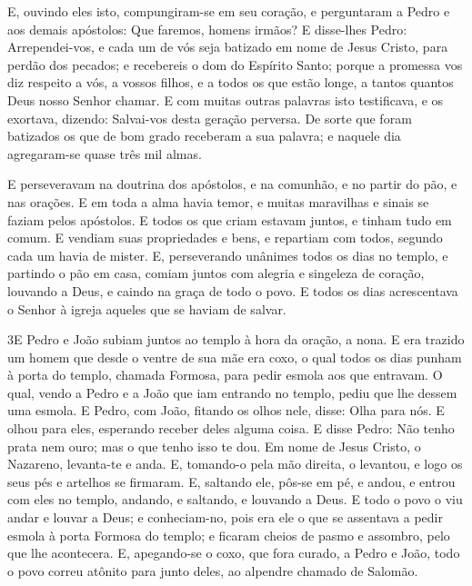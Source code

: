 E, ouvindo eles isto, compungiram-se em seu coração, e
perguntaram a Pedro e aos demais apóstolos: Que faremos, homens
irmãos? E disse-lhes Pedro: Arrependei-vos, e cada um de vós
seja batizado em nome de Jesus Cristo, para perdão dos pecados; e
recebereis o dom do Espírito Santo; porque a promessa vos diz
respeito a vós, a vossos filhos, e a todos os que estão longe, a
tantos quantos Deus nosso Senhor chamar. E com muitas outras
palavras isto testificava, e os exortava, dizendo: Salvai-vos desta
geração perversa. De sorte que foram batizados os que de bom
grado receberam a sua palavra; e naquele dia agregaram-se quase três
mil almas.

E perseveravam na doutrina dos apóstolos, e na comunhão, e no
partir do pão, e nas orações. E em toda a alma havia temor, e
muitas maravilhas e sinais se faziam pelos apóstolos. E todos
os que criam estavam juntos, e tinham tudo em comum. E
vendiam suas propriedades e bens, e repartiam com todos, segundo
cada um havia de mister. E, perseverando unânimes todos os
dias no templo, e partindo o pão em casa, comiam juntos com alegria
e singeleza de coração, louvando a Deus, e caindo na graça de
todo o povo. E todos os dias acrescentava o Senhor à igreja aqueles
que se haviam de salvar.

\medskip

\lettrine{3} E Pedro e João subiam juntos ao templo à hora da
oração, a nona. E era trazido um homem que desde o ventre de sua
mãe era coxo, o qual todos os dias punham à porta do templo, chamada
Formosa, para pedir esmola aos que entravam. O qual, vendo a
Pedro e a João que iam entrando no templo, pediu que lhe dessem uma
esmola. E Pedro, com João, fitando os olhos nele, disse: Olha
para nós. E olhou para eles, esperando receber deles alguma
coisa. E disse Pedro: Não tenho prata nem ouro; mas o que tenho
isso te dou. Em nome de Jesus Cristo, o Nazareno, levanta-te e anda.
E, tomando-o pela mão direita, o levantou, e logo os seus pés e
artelhos se firmaram. E, saltando ele, pôs-se em pé, e andou, e
entrou com eles no templo, andando, e saltando, e louvando a Deus.
E todo o povo o viu andar e louvar a Deus; e
conheciam-no, pois era ele o que se assentava a pedir esmola à porta
Formosa do templo; e ficaram cheios de pasmo e assombro, pelo que
lhe acontecera. E, apegando-se o coxo, que fora curado, a
Pedro e João, todo o povo correu atônito para junto deles, ao
alpendre chamado de Salomão.

